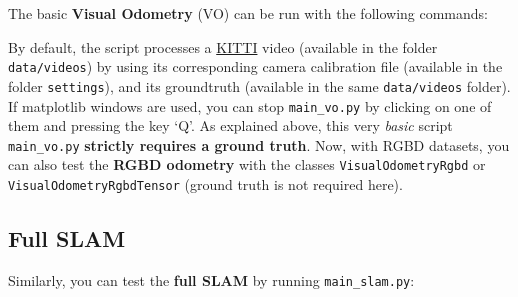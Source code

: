 \documentclass{article}
\newenvironment{Shaded}{\begin{snugshade}}{\end{snugshade}}
\newcommand{\BuiltInTok}[1]{\textcolor[rgb]{0.74,0.68,0.62}{#1}}
\newcommand{\CommentTok}[1]{\textcolor[rgb]{0.00,0.40,1.00}{\textbf{\textit{#1}}}}
\newcommand{\ExtensionTok}[1]{\textcolor[rgb]{0.74,0.68,0.62}{#1}}
\newcommand{\NormalTok}[1]{\textcolor[rgb]{0.74,0.68,0.62}{#1}}
\begin{document}
The basic \textbf{Visual Odometry} (VO) can be run with the following
commands:

\begin{scriptsize}
\begin{Shaded}
\end{Shaded}
\end{scriptsize}


By default, the script processes a
\href{http://www.cvlibs.net/datasets/kitti/eval_odometry.php}{KITTI}
video (available in the folder \texttt{data/videos}) by using its
corresponding camera calibration file (available in the folder
\texttt{settings}), and its groundtruth (available in the same
\texttt{data/videos} folder). If matplotlib windows are used, you can
stop \texttt{main\_vo.py} by clicking on one of them and
pressing the key `Q'. As explained above, this very \emph{basic} script
\texttt{main\_vo.py} \textbf{strictly requires a ground truth}. Now,
with RGBD datasets, you can also test the \textbf{RGBD odometry} with
the classes \texttt{VisualOdometryRgbd} or
\texttt{VisualOdometryRgbdTensor} (ground truth is not required here).

\hypertarget{full-slam}{%
\subsection{Full SLAM}\label{full-slam}}

Similarly, you can test the \textbf{full SLAM} by running
\texttt{main\_slam.py}:\\

\begin{scriptsize}
\begin{Shaded}
\end{Shaded}
\end{scriptsize}
\end{document}
